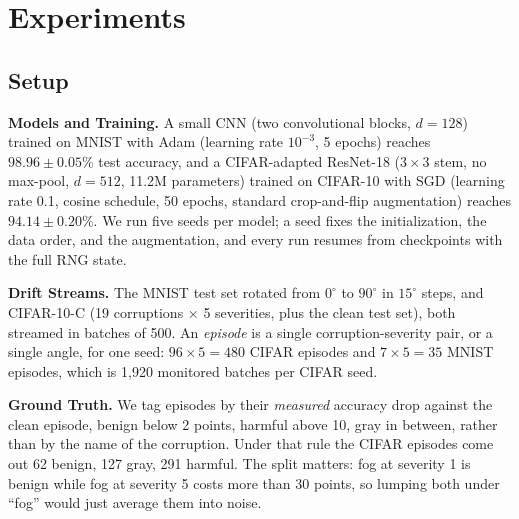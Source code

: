 \documentclass[acmsmall,screen]{acmart}
\newcommand{\runinhead}[1]{\par\smallskip\noindent\textbf{#1}\quad\ignorespaces}
\theoremstyle{acmdefinition}
\begin{document}
\section{Experiments}
\label{sec:experiments}

\subsection{Setup}

\runinhead{Models and Training.}
A small CNN (two convolutional blocks, $d = 128$) trained on MNIST with Adam
(learning rate $10^{-3}$, 5 epochs) reaches $98.96 \pm 0.05\%$ test accuracy,
and a CIFAR-adapted ResNet-18 ($3{\times}3$ stem, no max-pool, $d = 512$,
11.2M parameters) trained on CIFAR-10 with SGD (learning rate 0.1, cosine
schedule, 50 epochs, standard crop-and-flip augmentation) reaches
$94.14 \pm 0.20\%$. We run five seeds per model; a seed fixes the
initialization, the data order, and the augmentation, and every run resumes
from checkpoints with the full RNG state.

\runinhead{Drift Streams.}
The MNIST test set rotated from $0^\circ$ to $90^\circ$ in $15^\circ$ steps,
and CIFAR-10-C \cite{hendrycks2019benchmarking} (19 corruptions $\times$ 5
severities, plus the clean test set), both streamed in batches of 500. An
\emph{episode} is a single corruption-severity pair, or a single angle, for
one seed: $96 \times 5 = 480$ CIFAR episodes and $7 \times 5 = 35$ MNIST
episodes, which is 1{,}920 monitored batches per CIFAR seed.

\runinhead{Ground Truth.}
We tag episodes by their \emph{measured} accuracy drop against the clean
episode, benign below 2 points, harmful above 10, gray in between, rather than
by the name of the corruption. Under that rule the CIFAR episodes come out 62
benign, 127 gray, 291 harmful. The split matters: fog at severity 1 is
benign while fog at severity 5 costs more than 30 points, so lumping both
under ``fog'' would just average them into noise.
\end{document}
